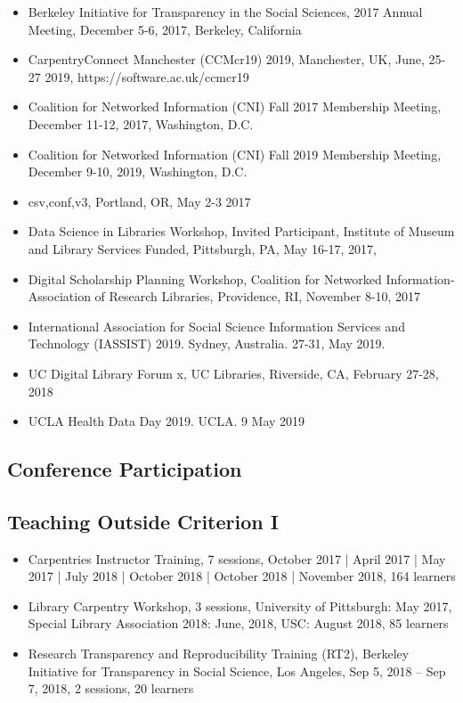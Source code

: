 \begin{itemize}[label={},leftmargin=!,labelindent=5pt,itemindent=-15pt]
  \item Berkeley Initiative for Transparency in the Social Sciences, 2017 Annual Meeting, December 5-6, 2017, Berkeley, California
  \item CarpentryConnect Manchester (CCMcr19) 2019, Manchester, UK, June, 25-27 2019, https://software.ac.uk/ccmcr19
  \item Coalition for Networked Information (CNI) Fall 2017 Membership Meeting, December 11-12, 2017, Washington, D.C.
  \item Coalition for Networked Information (CNI) Fall 2019 Membership Meeting, December 9-10, 2019, Washington, D.C.
  \item csv,conf,v3, Portland, OR, May 2-3 2017
  \item Data Science in Libraries Workshop, Invited Participant, Institute of Museum and Library Services Funded, Pittsburgh, PA, May 16-17, 2017,
  \item Digital Scholarship Planning Workshop, Coalition for Networked Information-Association of Research Libraries, Providence, RI, November 8-10, 2017
  \item International Association for Social Science Information Services and Technology (IASSIST) 2019. Sydney, Australia. 27-31, May 2019.
  \item UC Digital Library Forum x, UC Libraries, Riverside, CA, February 27-28, 2018
  \item UCLA Health Data Day 2019. UCLA. 9 May 2019
\end{itemize}


\subsection{Conference Participation}

\nocite{*}
\printbibliography[keyword={outlib-conf-part},title={Conference Participation},heading=none]


\subsection{Teaching Outside Criterion I}
\begin{itemize}[label={},leftmargin=!,labelindent=5pt,itemindent=-15pt]
  \item Carpentries Instructor Training, 7 sessions, October 2017 | April	2017 | May	2017 | July	2018 | October 2018 | October	2018 | November 2018,	164 learners
  \item Library Carpentry Workshop, 3 sessions, University of Pittsburgh: May	2017, Special Library Association 2018: June, 2018, USC: August	2018,	85 learners
  \item Research Transparency and Reproducibility Training (RT2), Berkeley Initiative for Transparency in Social Science, Los Angeles, Sep 5, 2018 -- Sep 7, 2018, 2 sessions, 20 learners
\end{itemize}
